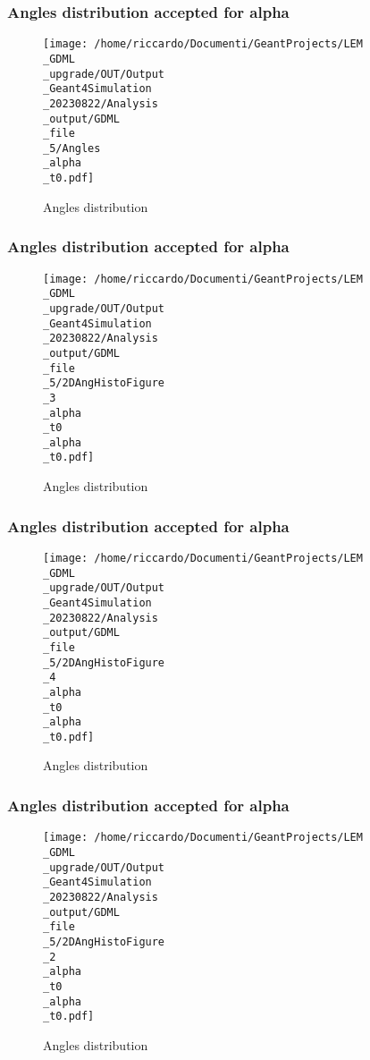 \documentclass[8pt]{beamer}
\begin{document}
            \begin{frame}
                \frametitle{Angles distribution accepted for alpha}
            
        \begin{figure}[h]
            \centering
            \texttt{[image: /home/riccardo/Documenti/GeantProjects/LEM\\\_GDML\\\_upgrade/OUT/Output\\\_Geant4Simulation\\\_20230822/Analysis\\\_output/GDML\\\_file\\\_5/Angles\\\_alpha\\\_t0.pdf]}
            \caption{Angles distribution}
        \end{figure}
        
            \end{frame}
            
            \begin{frame}
                \frametitle{Angles distribution accepted for alpha}
            
        \begin{figure}[h]
            \centering
            \texttt{[image: /home/riccardo/Documenti/GeantProjects/LEM\\\_GDML\\\_upgrade/OUT/Output\\\_Geant4Simulation\\\_20230822/Analysis\\\_output/GDML\\\_file\\\_5/2DAngHistoFigure\\\_3\\\_alpha\\\_t0\\\_alpha\\\_t0.pdf]}
            \caption{Angles distribution}
        \end{figure}
        
            \end{frame}
            
            \begin{frame}
                \frametitle{Angles distribution accepted for alpha}
            
        \begin{figure}[h]
            \centering
            \texttt{[image: /home/riccardo/Documenti/GeantProjects/LEM\\\_GDML\\\_upgrade/OUT/Output\\\_Geant4Simulation\\\_20230822/Analysis\\\_output/GDML\\\_file\\\_5/2DAngHistoFigure\\\_4\\\_alpha\\\_t0\\\_alpha\\\_t0.pdf]}
            \caption{Angles distribution}
        \end{figure}
        
            \end{frame}
            
            \begin{frame}
                \frametitle{Angles distribution accepted for alpha}
            
        \begin{figure}[h]
            \centering
            \texttt{[image: /home/riccardo/Documenti/GeantProjects/LEM\\\_GDML\\\_upgrade/OUT/Output\\\_Geant4Simulation\\\_20230822/Analysis\\\_output/GDML\\\_file\\\_5/2DAngHistoFigure\\\_2\\\_alpha\\\_t0\\\_alpha\\\_t0.pdf]}
            \caption{Angles distribution}
        \end{figure}
        
            \end{frame}
            
\end{document}
